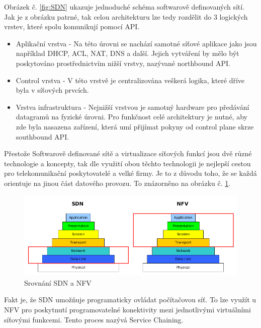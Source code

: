 Obrázek č. \ref{fig:SDN} ukazuje jednoduché schéma softwarově definovaných sítí. Jak je z obrázku patrné, tak celou architekturu lze tedy rozdělit do 3 logických vrstev, které spolu komunikují pomocí API. 

\begin{itemize}
\item Aplikační vrstva - Na této úrovni se nachází samotné síťové aplikace jako jsou například DHCP, ACL, NAT, DNS a další. Jejich vytváření by
mělo být poskytováno prostřednictvím nižší vrstvy, nazývané northbound API.
\item Control vrstva - V této vrstvě je centralizována veškerá logika, které dříve byla v síťových prvcích.
\item Vrstva infrastruktura - Nejnižší vrstvou je samotný hardware pro předávání datagramů na fyzické úrovni. Pro funkčnost celé architektury je nutné, aby zde byla nasazena zařízení, která umí přijímat pokyny od control plane skrze southbound API.
\end{itemize}

Přestože Softwarově definované sítě a virtualizace síťových funkcí jsou dvě různé technologie a koncepty, tak dle \cite{Toward_NFV} využití obou těchto technologii je nejlepší cestou pro telekomunikační poskytovatelé a velké firmy. Je to z důvodu toho, že se každá orientuje na jinou část datového provozu. To znázorněno na obrázku č. \ref{fig:sdn_nfv}.

\begin{figure}[h]
\begin{centering}
\includegraphics[scale=0.58]{images/sdn_nfv}
\par\end{centering}
\caption{ Srovnání SDN a NFV \label{fig:sdn_nfv}}
\end{figure}

Fakt je, že SDN umožňuje programaticky ovládat počítačovou síť. To lze využít u NFV pro poskytnutí programovatelné konektivity mezi jednotlivými virtuálními síťovými funkcemi. Tento proces nazývá Service Chaining.

